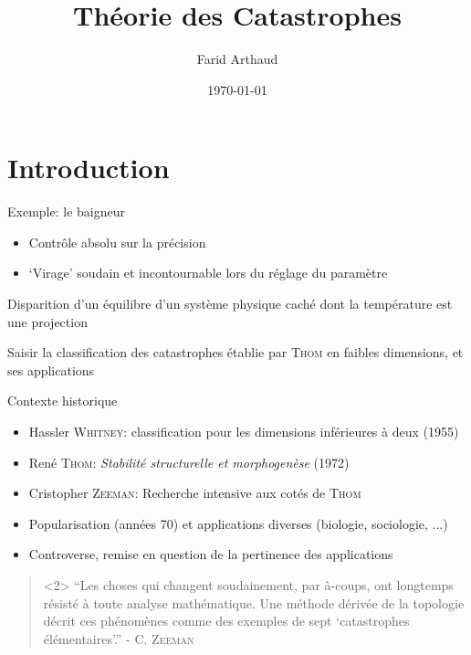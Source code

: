 \documentclass[compress]{beamer}
\author{Farid Arthaud}
\title{Théorie des Catastrophes}
\date{\today}
\theoremstyle{definition}
\begin{document}
\section*{Introduction}

\frame{\titlepage}

\frame{\tableofcontents}

\begin{frame}{Exemple: le baigneur}
    \begin{itemize}[<+->]
        \item Contrôle absolu sur la précision
        \item `Virage' soudain et incontournable lors du réglage du paramètre
    \end{itemize}
    \begin{description}[<+->]
        \item[Explication:] Disparition d'un équilibre d'un système physique caché dont la température est une projection
        \item[Objectif:] Saisir la classification des catastrophes établie par \textsc{Thom} en faibles dimensions, et ses applications
    \end{description}
\end{frame}

\begin{frame}{Contexte historique}
    \begin{itemize}
        \item Hassler \textsc{Whitney}: classification pour les dimensions inférieures à deux (1955)
        \item René \textsc{Thom}: \textit{Stabilité structurelle et morphogenèse} (1972)
        \item Cristopher \textsc{Zeeman}: Recherche intensive aux cotés de \textsc{Thom}
        \item Popularisation (années 70) et applications diverses (biologie, sociologie, ...)
        \item Controverse, remise en question de la pertinence des applications
    \end{itemize}
    \begin{quote}<2>
        ``Les choses qui changent soudainement, par à-coups, ont longtemps résisté à toute analyse mathématique.
        Une méthode dérivée de la topologie décrit ces phénomènes comme des exemples de sept `catastrophes élémentaires'.'' - C. \textsc{Zeeman}
    \end{quote}
\end{frame}
\end{document}
